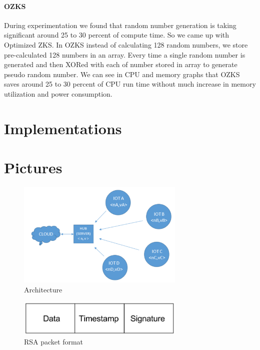 \documentclass[letterpaper,twocolumn,10pt]{article}
\begin{document}
\paragraph{OZKS} During experimentation we found that random number generation is taking significant around 25 to 30 percent of compute time. So we came up with Optimized ZKS. In OZKS instead of calculating 128 random numbers, we store pre-calculated 128 numbers in an array. Every time a single random number is generated and then XORed with each of number stored in array to generate pseudo random number. We can see in CPU and memory graphs that OZKS saves around 25 to 30 percent of CPU run time without much increase in memory utilization and power consumption.

\section{Implementations}




\section{Pictures}

\begin{figure}[htbp]
	\begin{center}
        \includegraphics[width=80mm]{Networkarchitecture.png}
		\caption{Architecture}
		\label{System Architecture}
	\end{center}
\end{figure}

\begin{figure}[htbp]
	\begin{center}
        \includegraphics[width=80mm]{Rsa_packet.png}
		\caption{RSA packet format}
		\label{rsa_packet}
	\end{center}
\end{figure}
\end{document}

